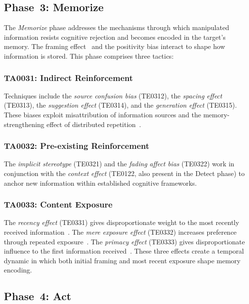 \documentclass[11pt,a4paper]{article}
\begin{document}
\subsection{Phase~3: Memorize}

The \textit{Memorize} phase addresses the mechanisms through which manipulated information resists cognitive rejection and becomes encoded in the target's memory. The framing effect~\cite{tversky1981} and the positivity bias interact to shape how information is stored. This phase comprises three tactics:

\subsubsection{TA0031: Indirect Reinforcement}
Techniques include the \textit{source confusion bias} (TE0312), the \textit{spacing effect} (TE0313), the \textit{suggestion effect} (TE0314), and the \textit{generation effect} (TE0315). These biases exploit misattribution of information sources and the memory-strengthening effect of distributed repetition~\cite{cepeda2006}.

\subsubsection{TA0032: Pre-existing Reinforcement}
The \textit{implicit stereotype} (TE0321) and the \textit{fading affect bias} (TE0322) work in conjunction with the \textit{context effect} (TE0122, also present in the Detect phase) to anchor new information within established cognitive frameworks.

\subsubsection{TA0033: Content Exposure}
The \textit{recency effect} (TE0331) gives disproportionate weight to the most recently received information~\cite{murdock1962}. The \textit{mere exposure effect} (TE0332) increases preference through repeated exposure~\cite{zajonc1968}. The \textit{primacy effect} (TE0333) gives disproportionate influence to the first information received~\cite{murdock1962}. These three effects create a temporal dynamic in which both initial framing and most recent exposure shape memory encoding.

\subsection{Phase~4: Act}
\end{document}
